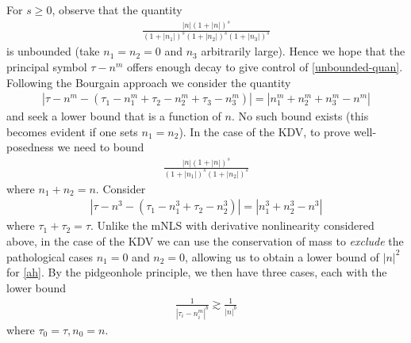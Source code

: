 \documentclass[12pt,reqno]{amsart}
\numberwithin{equation}{section}  %
\numberwithin{figure}{section}
\theoremstyle{plain}
\theoremstyle{definition}
\theoremstyle{remark}
\begin{document}
%
%
For $s \ge 0$, observe that the quantity 
%
%
\begin{equation}
	\label{unbounded-quan}
	\begin{split}
		\frac{| n | \left (1 + |n| \right ) ^s}{\left (1 + |n_1| \right ) ^s \left (1 + |n_2| \right ) ^s \left (1 + |n_3| \right ) ^s} 
	\end{split}
\end{equation}
is unbounded (take $n_1 = n_2 = 0$ and $n_3$ arbitrarily large). Hence
we hope that the  principal symbol $\tau - n^m$ offers enough
decay to give control of \eqref{unbounded-quan}. Following the Bourgain
approach we consider the quantity
%
%
\begin{equation*}
	\begin{split}
		| \tau - n^{m} - \left( \tau_{1} - n_{1}^m + \tau_{2} - n_{2}^m +
		\tau_{3} - n_{3}^m \right) | = |n_{1}^m + n_2^m + n_3^m - n^m|
	\end{split}
\end{equation*}
%
%
and seek a lower bound that is a function of $n$. No such bound exists (this
becomes evident if one sets $n_1 = n_2$). In the case of the KDV, to prove well-posedness we need to bound
\begin{equation}
	\label{KDV-bound-term}
	\begin{split}
		\frac{| n | \left (1 + |n| \right ) ^s}{\left (1 + |n_1| \right ) ^s \left (1 + |n_2| \right ) ^s} 
	\end{split}
\end{equation}
where $n_1 + n_2 = n$. 
Consider 
%
%
\begin{equation}
  \label{ah}
	\begin{split}
		| \tau - n^{3} - \left( \tau_{1} - n_{1}^3 + \tau_{2} - n_{2}^3 \right) | = |n_{1}^3 + n_2^3 - n^3|
	\end{split}
\end{equation}
where  $\tau_1 + \tau_2 = \tau$. Unlike the mNLS with derivative nonlinearity
considered above, in the case of the KDV we can use the conservation of mass to
\emph{exclude} the pathological cases $n_1=0$ and $n_2=0$, allowing us to obtain
a lower bound of $|n|^{2}$ for \eqref{ah}.
By the pidgeonhole principle, we then have three
cases, each with the lower bound
%
%
\begin{equation*}
	\begin{split}
		\frac{1}{| \tau_{i} - n_{i}^{m} |^{b}} \gtrsim \frac{1}{|n|^{b}}	
	\end{split}
\end{equation*}
%
%
where $\tau_0 =\tau, n_0 = n$. 
\end{document}
